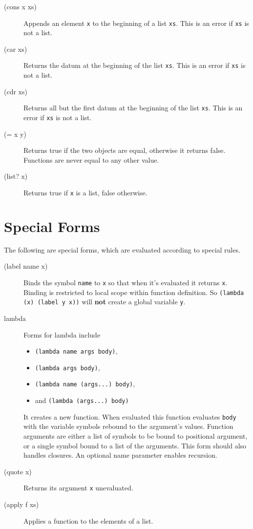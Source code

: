 \documentclass[12pt]{article}
\begin{document}
\begin{description}
\item[(cons x xs)] Appends an element \verb!x! to the beginning of a list
  \verb!xs!. This is an error if \verb!xs! is not a list.

\item[(car xs)] Returns the datum at the beginning of the list \verb!xs!. This
  is an error if \verb!xs! is not a list.

\item[(cdr xs)] Returns all but the first datum at the beginning of the list
  \verb!xs!. This is an error if \verb!xs! is not a list.

\item[(= x y)] Returns true if the two objects are equal, otherwise it returns
  false. Functions are never equal to any other value.

\item[(list? x)] Returns true if \verb!x! is a list, false otherwise.
\end{description}

\section{Special Forms}

The following are special forms, which are evaluated according to special rules.

\begin{description}
\item[(label name x)] Binds the symbol \verb!name! to \verb!x! so that when it's
  evaluated it returns \verb!x!. Binding is restricted to local scope within
  function definition. So \verb!(lambda (x) (label y x))! will \textbf{not}
  create a global variable \verb!y!.

\item[lambda] Forms for lambda include
  \begin{itemize}
    \item \verb!(lambda name args body)!,
    \item \verb!(lambda args body)!,
    \item \verb!(lambda name (args...) body)!,
    \item and \verb!(lambda (args...) body)!
  \end{itemize}

  It creates a new function. When evaluated this function evaluates \verb!body!
  with the variable symbols rebound to the argument's values. Function arguments
  are either a list of symbols to be bound to positional argument, or a single
  symbol bound to a list of the arguments. This form should also handles
  closures. An optional name parameter enables recursion.

\item[(quote x)] Returns its argument \verb!x! unevaluated.

\item[(apply f xs)] Applies a function to the elements of a list.
\end{description}
\end{document}
